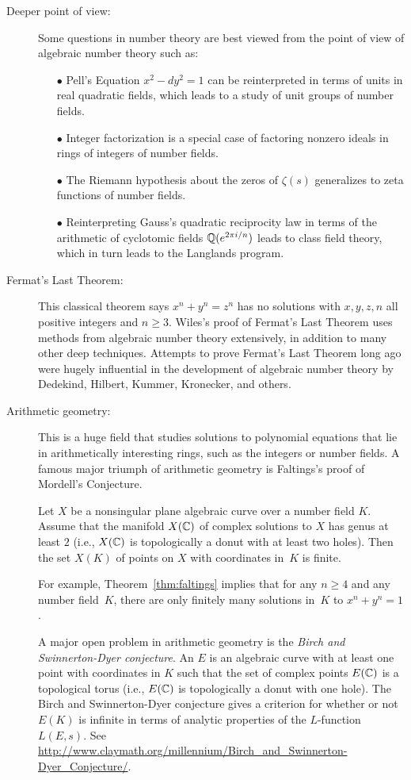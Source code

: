 \begin{description}
\item[Deeper point of view:]
Some questions in number theory
are best viewed from the point of view of algebraic number
theory such as:
\begin{enumerate}
	\item[$\bullet$]
		Pell's Equation $x^2-dy^2=1$ can be reinterpreted
		in terms of units in real quadratic fields, which
		leads to a study of unit groups of number fields.
	\item[$\bullet$]
		Integer factorization is a special case of factoring nonzero
		ideals in rings of integers of number fields.
	\item[$\bullet$]
		The Riemann hypothesis about the zeros of $\zeta(s)$
		generalizes to zeta functions of number fields.
	\item[$\bullet$]
		Reinterpreting Gauss's quadratic reciprocity law in terms of
		the arithmetic of cyclotomic fields $\mathbb{Q}(e^{2\pi i/n})$ leads
		to class field theory, which in turn leads to the Langlands
		program.
\end{enumerate}

\item[Fermat's Last Theorem:] 
This classical theorem says $x^n+y^n=z^n$ has no solutions with
$x,y,z,n$ all positive integers and $n\geq 3$. Wiles's
proof of Fermat's Last Theorem uses methods from
algebraic number theory extensively, in addition to many other deep
techniques.  Attempts to prove Fermat's Last Theorem long ago were
hugely influential in the development of algebraic number theory
by Dedekind, Hilbert, Kummer, Kronecker, and others.

\item[Arithmetic geometry:] This is a huge field that studies
solutions to polynomial equations that lie in arithmetically
interesting rings, such as the integers or number fields.  A famous
major triumph of arithmetic geometry is Faltings's proof of Mordell's
Conjecture.
\begin{theorem}[Faltings]\label{thm:faltings}
	Let $X$ be a nonsingular plane algebraic curve over a number
	field $K$.  Assume that the manifold $X(\mathbb{C})$ of complex solutions to
	$X$ has genus at least $2$ (i.e., $X(\mathbb{C})$ is topologically a donut
	with at least two holes).  Then the set $X(K)$ of points on $X$ with
	coordinates in~$K$ is finite.
\end{theorem}
For example, Theorem~\ref{thm:faltings} implies that for any $n\geq 4$
and any number field~$K$, there are only finitely many solutions
in~$K$ to $x^n+y^n=1$.

A major open problem in arithmetic geometry is the
{\em Birch and Swinnerton-Dyer conjecture}.
An  $E$ is an algebraic curve with at least one point
with coordinates in $K$ such that the set of complex points
$E(\mathbb{C})$ is a topological torus (i.e., $E(\mathbb{C})$ is topologically a donut
with one hole).
The Birch and Swinnerton-Dyer conjecture gives a
criterion for whether or not $E(K)$ is infinite in
terms of analytic properties of the $L$-function $L(E,s)$.
See \url{http://www.claymath.org/millennium/Birch_and_Swinnerton-Dyer_Conjecture/}.

\end{description}


